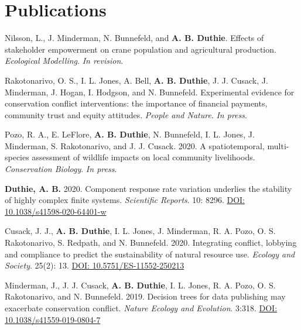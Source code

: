 \documentclass[letterpaper]{article}
\begin{document}
\section*{Publications}
\begin{etaremune}
\item Nilsson, L., J. Minderman, N. Bunnefeld, and {\bf A. B. Duthie}. Effects of stakeholder empowerment on crane population and agricultural production. {\it Ecological Modelling}. {\it In revision}.
\item Rakotonarivo, O. S., I. L. Jones, A. Bell, {\bf A. B. Duthie}, J. J. Cusack, J. Minderman, J. Hogan, I. Hodgson, and N. Bunnefeld. Experimental evidence for conservation conflict interventions: the importance of financial payments, community trust and equity attitudes. {\it People and Nature}. {\it In press}. 
\item Pozo, R. A., E. LeFlore, {\bf A. B. Duthie}, N. Bunnefeld, I. L. Jones, J. Minderman, S. Rakotonarivo, and J. J. Cusack. 2020. A spatiotemporal, multi-species assessment of wildlife impacts on local community livelihoods. {\it Conservation Biology}. {\it In press}.
\item {\bf Duthie, A. B.} 2020. Component response rate variation underlies the stability of highly complex finite systems. {\it Scientific Reports}. 10: 8296. \href{https://www.nature.com/articles/s41598-020-64401-w}{DOI: 10.1038/s41598-020-64401-w}
\item Cusack, J. J., {\bf A. B. Duthie}, I. L. Jones, J. Minderman, R. A. Pozo, O. S. Rakotonarivo, S. Redpath, and N. Bunnefeld. 2020. Integrating conflict, lobbying and compliance to predict the sustainability of natural resource use. {\it Ecology and Society}. 25(2): 13. \href{https://doi.org/10.5751/ES-11552-250213}{DOI: 10.5751/ES-11552-250213}
\item Minderman, J., J. J. Cusack, {\bf A. B. Duthie}, I. L. Jones, R. A. Pozo, O. S. Rakotonarivo, and N. Bunnefeld. 2019. Decision trees for data publishing may exacerbate conservation conflict. {\it Nature Ecology and Evolution}. 3:318. \href{https://doi.org/10.1038/s41559-019-0804-7}{DOI: 10.1038/s41559-019-0804-7}

\end{etaremune}
\end{document}
